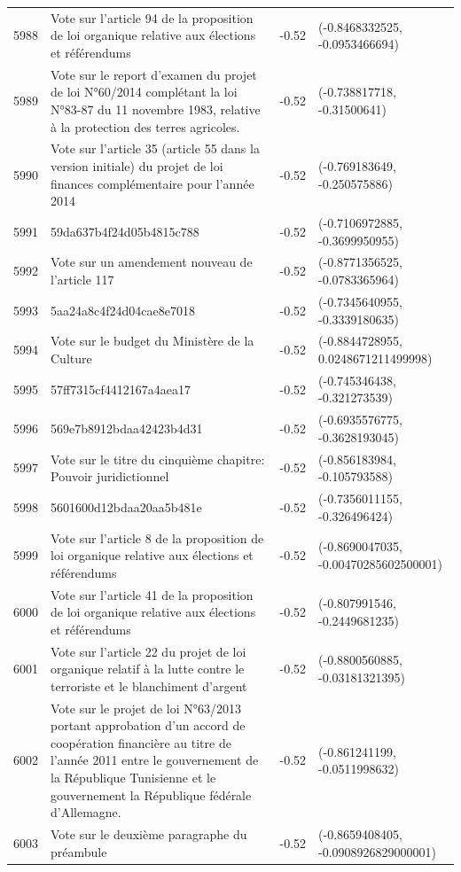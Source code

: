 \begin{table}[ht]
\begin{tabular}{rlrl}
  5988 & Vote sur l'article 94 de la proposition de loi organique relative aux élections et référendums & -0.52 & (-0.8468332525, -0.0953466694) \\ 
  5989 & Vote sur le report d'examen du projet de loi N°60/2014 complétant la loi N°83-87 du 11 novembre 1983, relative à la protection des terres agricoles. & -0.52 & (-0.738817718, -0.31500641) \\ 
  5990 & Vote sur l'article 35 (article 55 dans la version initiale) du projet de loi finances complémentaire pour l'année 2014 & -0.52 & (-0.769183649, -0.250575886) \\ 
  5991 & 59da637b4f24d05b4815c788 & -0.52 & (-0.7106972885, -0.3699950955) \\ 
  5992 & Vote sur un amendement nouveau de l'article 117 & -0.52 & (-0.8771356525, -0.0783365964) \\ 
  5993 & 5aa24a8c4f24d04cae8e7018 & -0.52 & (-0.7345640955, -0.3339180635) \\ 
  5994 & Vote sur le budget du Ministère de la Culture & -0.52 & (-0.8844728955, 0.0248671211499998) \\ 
  5995 & 57ff7315cf4412167a4aea17 & -0.52 & (-0.745346438, -0.321273539) \\ 
  5996 & 569e7b8912bdaa42423b4d31 & -0.52 & (-0.6935576775, -0.3628193045) \\ 
  5997 & Vote sur le titre du cinquième chapitre: Pouvoir juridictionnel & -0.52 & (-0.856183984, -0.105793588) \\ 
  5998 & 5601600d12bdaa20aa5b481e & -0.52 & (-0.7356011155, -0.326496424) \\ 
  5999 & Vote sur l'article 8 de la proposition de loi organique relative aux élections et référendums & -0.52 & (-0.8690047035, -0.00470285602500001) \\ 
  6000 & Vote sur l'article 41 de la proposition de loi organique relative aux élections et référendums & -0.52 & (-0.807991546, -0.2449681235) \\ 
  6001 & Vote sur l'article 22 du projet de loi organique relatif à la lutte contre le terroriste et le blanchiment d'argent & -0.52 & (-0.8800560885, -0.03181321395) \\ 
  6002 & Vote sur le projet de loi N°63/2013 portant approbation d'un accord de coopération financière au titre de l'année 2011 entre le gouvernement de la République Tunisienne et le gouvernement la République fédérale d'Allemagne. & -0.52 & (-0.861241199, -0.0511998632) \\ 
  6003 & Vote sur le deuxième paragraphe du préambule & -0.52 & (-0.8659408405, -0.0908926829000001) \\ 

\end{tabular}
\end{table}
